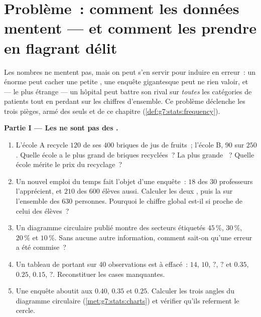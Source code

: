 \section{Problème~: comment les données mentent --- et comment les
prendre en flagrant délit}

\begin{problem}
\label{pb:g7:stats:1}
Les nombres ne mentent pas, mais on peut s'en servir pour induire
en erreur~: un  énorme peut cacher une petite , une
enquête gigantesque peut ne rien valoir, et --- le plus étrange ---
un hôpital peut battre son rival sur \emph{toutes} les catégories de
patients tout en perdant sur les chiffres d'ensemble. Ce problème
déclenche les trois pièges, armé des seuls  et  de ce
chapitre (\cref{def:g7:stats:frequency}).

\medskip
\noindent\textbf{Partie I --- Les  ne sont pas des
.}
\begin{enumerate}
  \item L'école A recycle $120$ de ses $400$ briques de jus de
        fruits~; l'école B, $90$ sur $250$. Quelle école a le plus
        grand \emph{} de briques recyclées~? La plus grande
        \emph{}~? Quelle école mérite le prix du
        recyclage~?
  \item Un nouvel emploi du temps fait l'objet d'une enquête~: $18$
        des $30$ professeurs l'apprécient, et $210$ des $600$ élèves
        aussi. Calculer les deux , puis la  sur
        l'ensemble des $630$ personnes. Pourquoi le chiffre global
        est-il si proche de celui des élèves~?
  \item Un diagramme circulaire publié montre des secteurs étiquetés
        $45\,\%$, $30\,\%$, $20\,\%$ et $10\,\%$. Sans aucune autre
        information, comment sait-on qu'une erreur a été commise~?
  \item Un tableau de  portant sur $40$ observations est à
         effacé~:  $14$, $10$, $?$, $?$ et 
        $0.35$, $0.25$, $0.15$, $?$. Reconstituer les cases
        manquantes.
  \item Une enquête aboutit aux  $0.40$, $0.35$ et $0.25$.
        Calculer les trois angles du diagramme circulaire
        (\cref{met:g7:stats:charts}) et vérifier qu'ils referment le
        cercle.
\end{enumerate}


\end{problem}
